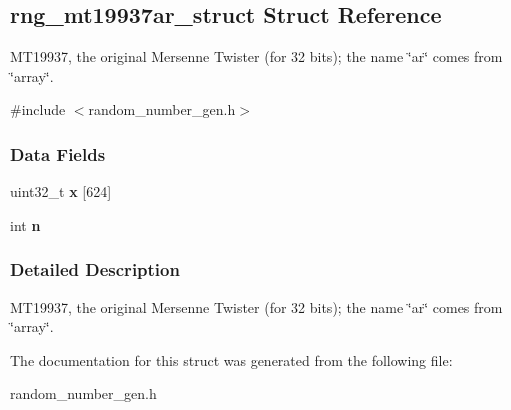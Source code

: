 \hypertarget{structrng__mt19937ar__struct}{}\subsection{rng\+\_\+mt19937ar\+\_\+struct Struct Reference}
\label{structrng__mt19937ar__struct}


M\+T19937, the original Mersenne Twister (for 32 bits); the name \char`\"{}ar\char`\"{} comes from \char`\"{}array\char`\"{}.  




{\ttfamily \#include $<$random\+\_\+number\+\_\+gen.\+h$>$}

\subsubsection*{Data Fields}
\begin{DoxyCompactItemize}
\item 
\mbox{\label{structrng__mt19937ar__struct_acab7bb9663018853f10184b9391a6537}} 
uint32\+\_\+t {\bfseries x} \mbox{[}624\mbox{]}
\item 
\mbox{\label{structrng__mt19937ar__struct_a1fcbbb7a302db25bfc519f7f73e80c46}} 
int {\bfseries n}
\end{DoxyCompactItemize}


\subsubsection{Detailed Description}
M\+T19937, the original Mersenne Twister (for 32 bits); the name \char`\"{}ar\char`\"{} comes from \char`\"{}array\char`\"{}. 

The documentation for this struct was generated from the following file\+:\begin{DoxyCompactItemize}
\item 
random\+\_\+number\+\_\+gen.\+h\end{DoxyCompactItemize}
